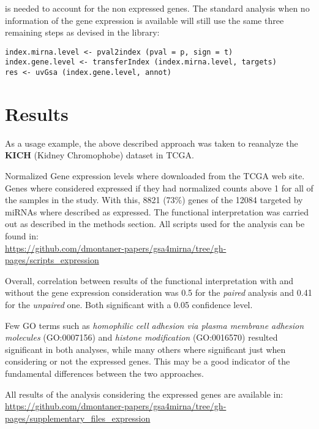\documentclass[]{article}
\begin{document}
is needed to account for the non expressed genes. The standard analysis
when no information of the gene expression is available will still use
the same three remaining steps as devised in the library:

\begin{verbatim}
index.mirna.level <- pval2index (pval = p, sign = t)
index.gene.level <- transferIndex (index.mirna.level, targets)
res <- uvGsa (index.gene.level, annot)
\end{verbatim}

\section{Results}\label{results}

As a usage example, the above described approach was taken to reanalyze
the \textbf{KICH} (Kidney Chromophobe) dataset in TCGA.

Normalized Gene expression levels where downloaded from the TCGA web
site. Genes where considered expressed if they had normalized counts
above 1 for all of the samples in the study. With this, 8821 (73\%)
genes of the 12084 targeted by miRNAs where described as expressed. The
functional interpretation was carried out as described in the methods
section. All scripts used for the analysis can be found in:\\
\url{https://github.com/dmontaner-papers/gsa4mirna/tree/gh-pages/scripts_expression}

\bigskip

Overall, correlation between results of the functional interpretation
with and without the gene expression consideration was 0.5 for the
\emph{paired} analysis and 0.41 for the \emph{unpaired} one. Both
significant with a 0.05 confidence level.

Few GO terms such as \emph{homophilic cell adhesion via plasma membrane
adhesion molecules} (GO:0007156) and \emph{histone modification}
(GO:0016570) resulted significant in both analyses, while many others
where significant just when considering or not the expressed genes. This
may be a good indicator of the fundamental differences between the two
approaches.

All results of the analysis considering the expressed genes are
available in:\\
\url{https://github.com/dmontaner-papers/gsa4mirna/tree/gh-pages/supplementary_files_expression}
\end{document}
